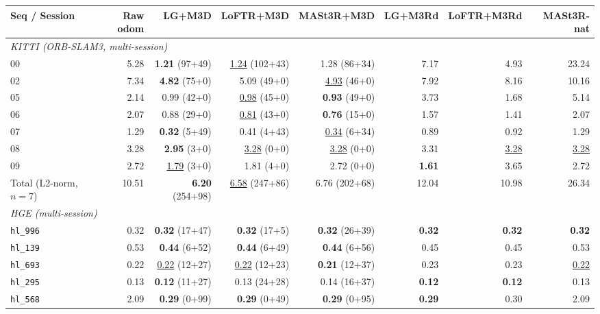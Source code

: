 \begin{table}[htb]
  \centering
  \scriptsize
  \begin{tabular*}{\textwidth}{@{\extracolsep{\fill}} lrrrrrrr}
  \hline
  \textbf{Seq / Session} & \textbf{Raw odom} & \textbf{LG+M3D} & \textbf{LoFTR+M3D} & \textbf{MASt3R+M3D} & \textbf{LG+M3Rd} & \textbf{LoFTR+M3Rd} & \textbf{MASt3R-nat} \\
  \hline
  \multicolumn{8}{l}{\textit{KITTI (ORB-SLAM3, multi-session)}} \\
  00 & 5.28 & \textbf{1.21} (97+49) & \underline{1.24} (102+43) & 1.28 (86+34) & 7.17 & 4.93 & 23.24 \\
  02 & 7.34 & \textbf{4.82} (75+0) & 5.09 (49+0) & \underline{4.93} (46+0) & 7.92 & 8.16 & 10.16 \\
  05 & 2.14 & 0.99 (42+0) & \underline{0.98} (45+0) & \textbf{0.93} (49+0) & 3.73 & 1.68 & 5.14 \\
  06 & 2.07 & 0.88 (29+0) & \underline{0.81} (43+0) & \textbf{0.76} (15+0) & 1.57 & 1.41 & 2.07 \\
  07 & 1.29 & \textbf{0.32} (5+49) & 0.41 (4+43) & \underline{0.34} (6+34) & 0.89 & 0.92 & 1.29 \\
  08 & 3.28 & \textbf{2.95} (3+0) & \underline{3.28} (0+0) & \underline{3.28} (0+0) & 3.31 & \underline{3.28} & \underline{3.28} \\
  09 & 2.72 & \underline{1.79} (3+0) & 1.81 (4+0) & 2.72 (0+0) & \textbf{1.61} & 3.65 & 2.72 \\
  \hline
  Total (L2-norm, $n{=}7$) & 10.51 & \textbf{6.20} (254+98) & \underline{6.58} (247+86) & 6.76 (202+68) & 12.04 & 10.98 & 26.34 \\
  \hline
  \multicolumn{8}{l}{\textit{HGE (multi-session)}} \\
  \texttt{hl\_996} & 0.32 & \textbf{0.32} (17+47) & \textbf{0.32} (17+5) & \textbf{0.32} (26+39) & \textbf{0.32} & \textbf{0.32} & \textbf{0.32} \\
  \texttt{hl\_139} & 0.53 & \textbf{0.44} (6+52) & \textbf{0.44} (6+49) & \textbf{0.44} (6+56) & 0.45 & 0.45 & 0.53 \\
  \texttt{hl\_693} & 0.22 & \underline{0.22} (12+27) & \underline{0.22} (12+23) & \textbf{0.21} (12+37) & 0.23 & 0.23 & \underline{0.22} \\
  \texttt{hl\_295} & 0.13 & \textbf{0.12} (11+27) & 0.13 (24+28) & 0.14 (16+37) & \textbf{0.12} & \textbf{0.12} & 0.13 \\
  \texttt{hl\_568} & 2.09 & \textbf{0.29} (0+99) & \textbf{0.29} (0+49) & \textbf{0.29} (0+95) & \textbf{0.29} & 0.30 & 2.09 \\

\end{tabular*}
\end{table}
